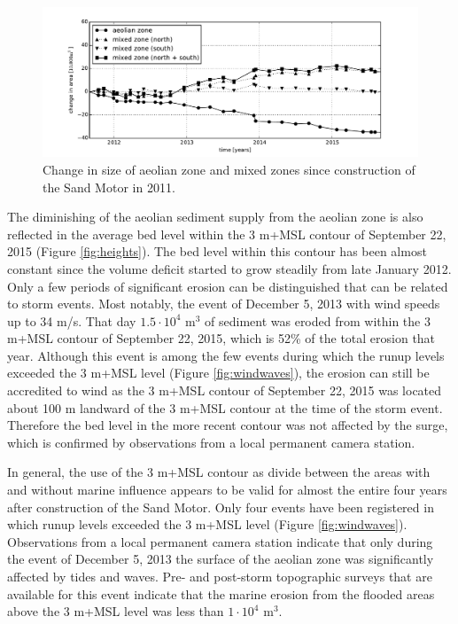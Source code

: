 \begin{figure}
  \centering
  \includegraphics[width=\columnwidth]{../Figures/areas}
  \caption{Change in size of aeolian zone and mixed zones since
    construction of the Sand Motor in 2011.}
  \label{fig:areas}
\end{figure}

The diminishing of the aeolian sediment supply from the aeolian zone
is also reflected in the average bed level within the 3 m+MSL contour
of September 22, 2015 (Figure \ref{fig:heights}). The bed level within
this contour has been almost constant since the volume deficit started
to grow steadily from late January 2012. Only a few periods of
significant erosion can be distinguished that can be related to storm
events. Most notably, the event of December 5, 2013 with wind speeds
up to 34 m/s. That day $\mathrm{1.5 \cdot 10^4}$ $\mathrm{m^3}$ of
sediment was eroded from within the 3 m+MSL contour of September 22,
2015, which is 52\% of the total erosion that year. Although this
event is among the few events during which the runup levels exceeded
the 3 m+MSL level (Figure \ref{fig:windwaves}), the erosion can still
be accredited to wind as the 3 m+MSL contour of September 22, 2015 was
located about 100 m landward of the 3 m+MSL contour at the time of the
storm event. Therefore the bed level in the more recent contour was
not affected by the surge, which is confirmed by observations from a
local permanent camera station.%

In general, the use of the 3 m+MSL contour as divide between the areas
with and without marine influence appears to be valid for almost the
entire four years after construction of the Sand Motor. Only four
events have been registered in which runup levels exceeded the 3 m+MSL
level (Figure \ref{fig:windwaves}). Observations from a local
permanent camera station indicate that only during the event of
December 5, 2013 the surface of the aeolian zone was significantly
affected by tides and waves. Pre- and post-storm topographic surveys
that are available for this event indicate that the marine erosion
from the flooded areas above the 3 m+MSL level was less than
$\mathrm{1 \cdot 10^4}$ $\mathrm{m^3}$.

